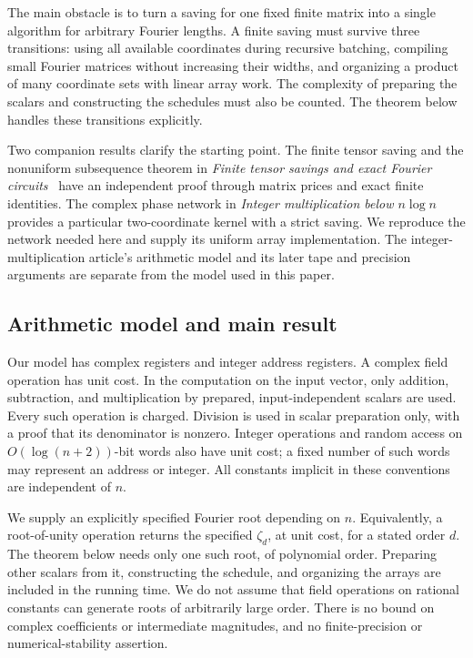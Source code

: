 The main obstacle is to turn a saving for one fixed finite matrix into a
single algorithm for arbitrary Fourier lengths. A finite saving must survive
three transitions: using all available coordinates during recursive batching,
compiling small Fourier matrices without increasing their widths, and
organizing a product of many coordinate sets with linear array work.
The complexity of preparing the scalars and constructing the schedules must
also be counted. The theorem below handles these transitions explicitly.

Two companion results clarify the starting point. The finite tensor saving
and the nonuniform subsequence theorem in
\emph{Finite tensor savings and exact Fourier circuits}~\cite{exactfourier}
have an independent proof through matrix prices and exact finite identities.
The complex phase network in
\emph{Integer multiplication below $n\log n$}~\cite[Proposition~8 and
Section~3.5]{motif} provides a particular two-coordinate kernel with a
strict saving. We reproduce the network needed here and supply its
uniform array implementation. The integer-multiplication article's
arithmetic model and its later tape and precision arguments are separate
from the model used in this paper.

\subsection{Arithmetic model and main result}
\label{sec:model}

Our model has complex registers and integer address registers. A complex field operation has unit cost. In the computation on the input vector, only addition, subtraction, and multiplication by prepared, input-independent scalars are used. Every such operation is charged. Division is used in scalar preparation only, with a proof that its denominator is nonzero. Integer operations and random access on $O(\log(n+2))$-bit words also have unit cost; a fixed number of such words may represent an address or integer. All constants implicit in these conventions are independent of $n$.

We supply an explicitly specified Fourier root depending on $n$. Equivalently, a root-of-unity operation returns the specified $\zeta_d$, at unit cost, for a stated order $d$. The theorem below needs only one such root, of polynomial order. Preparing other scalars from it, constructing the schedule, and organizing the arrays are included in the running time. We do not assume that field operations on rational constants can generate roots of arbitrarily large order. There is no bound on complex coefficients or intermediate magnitudes, and no finite-precision or numerical-stability assertion.

